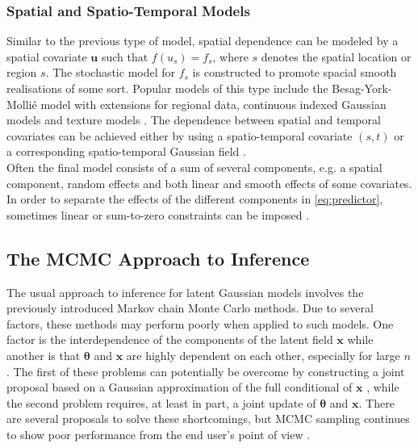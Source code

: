 \subsubsection*{Spatial and Spatio-Temporal Models}
Similar to the previous type of model, spatial dependence can be modeled by a spatial covariate $\pmb{u}$ such that $f\left(u_s\right)=f_s$, where $s$ denotes the spatial location or region $s$. The stochastic model for $f_s$ is constructed to promote spacial smooth realisations of some sort. Popular models of this type include the Besag-York-Mollié \autocite[][]{besag1991bayesian} model with extensions for regional data, continuous indexed Gaussian models \autocite[][]{banerjee2014hierarchical} and texture models \autocite[][]{marroquin2001gauss}. The dependence between spatial and temporal covariates can be achieved either by using a spatio-temporal covariate $(s,t)$ or a corresponding spatio-temporal Gaussian field \autocite[][]{kammann2003geoadditive}.\\
Often the final model consists of a sum of several components, e.g. a spatial component, random effects and both linear and smooth effects of some covariates. In order to separate the effects of the different components in \eqref{eq:predictor}, sometimes linear or sum-to-zero constraints can be imposed \autocite[][319--321]{rue2009approximate}.
\subsection{The MCMC Approach to Inference}
The usual approach to inference for latent Gaussian models involves the previously introduced Markov chain Monte Carlo methods. Due to several factors, these methods may perform poorly when applied to such models. One factor is the interdependence of the components of the latent field $\pmb{x}$ while another is that $\pmb{\theta}$ and $\pmb{x}$ are highly dependent on each other, especially for large $n$. The first of these problems can potentially be overcome by constructing a joint proposal based on a Gaussian approximation of the full conditional of $\pmb{x}$ \autocite[][]{gamerman1997sampling}, while the second problem requires, at least in part, a joint update of $\pmb{\theta}$ and $\pmb{x}$. There are several proposals to solve these shortcomings, but MCMC sampling continues to show poor performance from the end user's point of view \autocite[][322]{rue2009approximate}.
